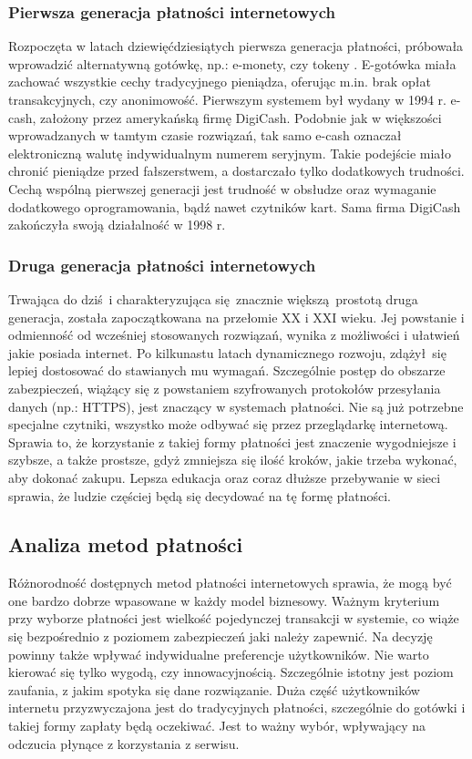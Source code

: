 \subsubsection*{Pierwsza generacja płatności internetowych}

Rozpoczęta w latach dziewięćdziesiątych pierwsza generacja płatności, próbowała wprowadzić alternatywną gotówkę, np.: e-monety, czy tokeny \cite{elektroniczne_metody_platnosci}. E-gotówka miała zachować wszystkie cechy tradycyjnego pieniądza, oferując m.in. brak opłat transakcyjnych, czy anonimowość. Pierwszym systemem był wydany w 1994 r. e-cash, założony przez amerykańską firmę DigiCash. Podobnie jak w większości wprowadzanych w tamtym czasie rozwiązań, tak samo e-cash oznaczał elektroniczną walutę indywidualnym numerem seryjnym. Takie podejście miało chronić pieniądze przed fałszerstwem, a dostarczało tylko dodatkowych trudności. Cechą wspólną pierwszej generacji jest trudność w obsłudze oraz wymaganie dodatkowego oprogramowania, bądź nawet czytników kart. Sama firma DigiCash zakończyła swoją działalność w 1998 r.

\subsubsection*{Druga generacja płatności internetowych}

Trwająca do dziś i charakteryzująca się znacznie większą prostotą druga generacja, została zapoczątkowana na przełomie XX i XXI wieku. Jej powstanie i odmienność od wcześniej stosowanych rozwiązań, wynika z możliwości i ułatwień jakie posiada internet. Po kilkunastu latach dynamicznego rozwoju, zdążył się lepiej dostosować do stawianych mu wymagań. Szczególnie postęp do obszarze zabezpieczeń, wiążący się z powstaniem szyfrowanych protokołów przesyłania danych (np.: HTTPS), jest znaczący w systemach płatności. Nie są już potrzebne specjalne czytniki, wszystko może odbywać się przez przeglądarkę internetową. Sprawia to, że korzystanie z takiej formy płatności jest znaczenie wygodniejsze i szybsze, a także prostsze, gdyż zmniejsza się ilość kroków, jakie trzeba wykonać, aby dokonać zakupu. Lepsza edukacja oraz coraz dłuższe przebywanie w sieci sprawia, że ludzie częściej będą się decydować na tę formę płatności.  


\subsection{Analiza metod płatności}

Różnorodność dostępnych metod płatności internetowych sprawia, że mogą być one bardzo dobrze wpasowane w każdy model biznesowy. Ważnym kryterium przy wyborze płatności jest wielkość pojedynczej transakcji w systemie, co wiąże się bezpośrednio z poziomem zabezpieczeń jaki należy zapewnić. Na decyzję powinny także wpływać indywidualne preferencje użytkowników. Nie warto kierować się tylko wygodą, czy innowacyjnością. Szczególnie istotny jest poziom zaufania, z jakim spotyka się dane rozwiązanie. Duża część użytkowników internetu przyzwyczajona jest do tradycyjnych płatności, szczególnie do gotówki i takiej formy zapłaty będą oczekiwać. Jest to ważny wybór, wpływający na odczucia płynące z korzystania z serwisu.


